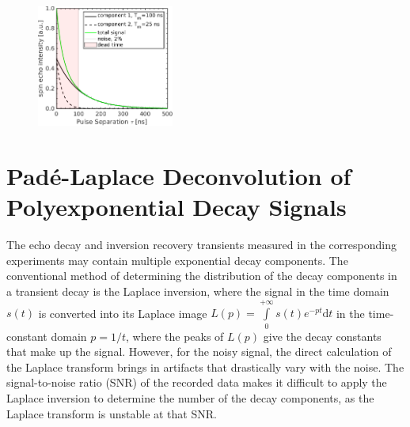 \subsection{}
\label{esi:dead_time}


\begin{figure}[h]
\center
	\includegraphics[width=0.4\textwidth]{./pulse/figures/Figure_S25}
	\caption{}
	\label{fig:Figure_S25}
\end{figure}


\section{Pad{\'e}-Laplace Deconvolution of Polyexponential Decay Signals}
\label{sec:pade-laplace}
The echo decay and inversion recovery transients measured in the corresponding experiments may contain multiple exponential decay components. The conventional method of determining the distribution of the decay components in a transient decay is the Laplace inversion, where the signal in the time domain $s(t)$ is converted into its Laplace image $L(p)=\int\limits_{0}^{+\infty}s(t)e^{-pt}\mathrm{d}t$ in the time-constant domain $p=1/t$, where the peaks of $L(p)$ give the decay constants that make up the signal. However, for the noisy signal, the direct calculation of the Laplace transform brings in artifacts that drastically vary with the noise. The signal-to-noise ratio (SNR) of the recorded data makes it difficult to apply the Laplace inversion to determine the number of the decay components, as the Laplace transform is unstable at that SNR. \\ 


